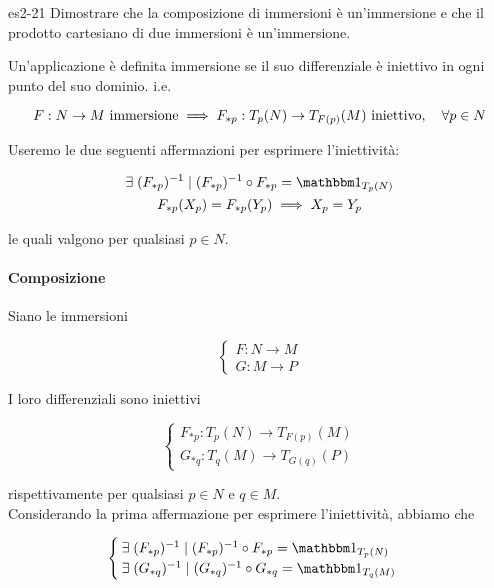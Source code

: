 {es2-21}
{
Dimostrare che la composizione di immersioni è un’immersione e che il prodotto cartesiano di due immersioni è un’immersione.
}
{
Un'applicazione è definita immersione se il suo differenziale è iniettivo in ogni punto del suo dominio. i.e.

\begin{equation}
	F : N \to M \text{ immersione} %
	\implies %
	F_{*p} : T_{p}(N) \to T_{F(p)}(M) \text{ iniettivo} \qcomma \forall p \in N
\end{equation}

Useremo le due seguenti affermazioni per esprimere l'iniettività:

\begin{gather}
	\E (F_{*p})^{-1} \mid (F_{*p})^{-1} \circ F_{*p} = \bigone_{T_{p}(N)} \\
	F_{*p}(X_{p}) = F_{*p}(Y_{p}) \implies X_{p} = Y_{p}
\end{gather}

le quali valgono per qualsiasi $ p \in N $.

\paragraph{Composizione}

Siano le immersioni

\begin{equation}
	\begin{cases}
		F : N \to M \\
		G : M \to P
	\end{cases}
\end{equation}

I loro differenziali sono iniettivi

\begin{equation}
	\begin{cases}
		F_{*p} : T_{p}(N) \to T_{F(p)}(M) \\
		G_{*q} : T_{q}(M) \to T_{G(q)}(P)
	\end{cases}
\end{equation}

rispettivamente per qualsiasi $ p \in N $ e $ q \in M $. \\
Considerando la prima affermazione per esprimere l'iniettività, abbiamo che

\begin{equation}
	\begin{cases}
		\E (F_{*p})^{-1} \mid (F_{*p})^{-1} \circ F_{*p} = \bigone_{T_{p}(N)} \\
		\E (G_{*q})^{-1} \mid (G_{*q})^{-1} \circ G_{*q} = \bigone_{T_{q}(M)}
	\end{cases}
\end{equation}

}
